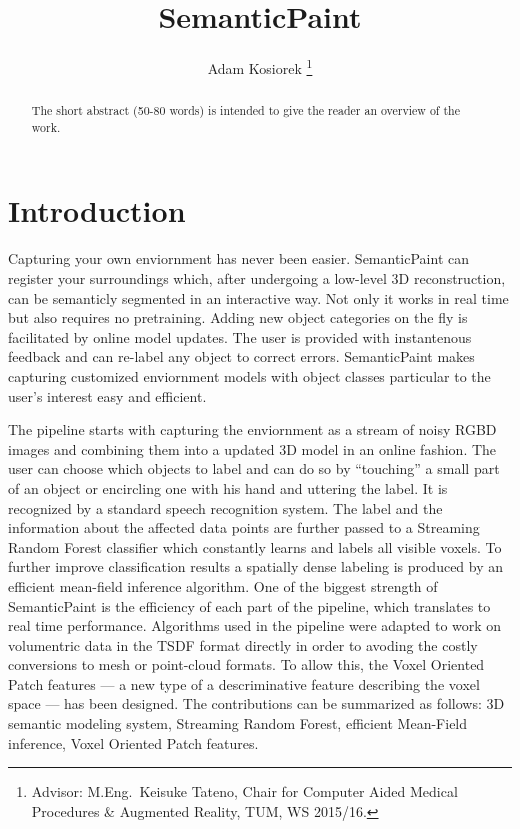 \documentclass{llncs}
\begin{document}
	\title{SemanticPaint}
	\author{Adam Kosiorek
	\thanks{Advisor: M.Eng.~Keisuke Tateno, Chair for Computer Aided Medical Procedures \& Augmented Reality, TUM, WS 2015/16.}}
	\institute{}
	\maketitle

\begin{abstract}
	The short abstract (50-80 words) is intended to give the reader an overview of the work.
\end{abstract}

\section{Introduction}
  
  
  Capturing your own enviornment has never been easier. SemanticPaint can register your surroundings which, after undergoing a low-level 3D reconstruction, can be semanticly segmented in an interactive way. Not only it works in real time but also requires no pretraining. Adding new object categories on the fly is facilitated by online model updates. The user is provided with instantenous feedback and can re-label any object to correct errors. SemanticPaint makes capturing customized enviornment models with object classes particular to the user's interest easy and efficient.  
  
  The pipeline starts with capturing the enviornment as a stream of noisy RGBD images and combining them into a updated 3D model in an online fashion. The user can choose which objects to label and can do so by ``touching'' a small part of an object or encircling one with his hand and uttering the label. It is recognized by a standard speech recognition system. The label and the information about the affected data points are further passed to a Streaming Random Forest classifier which constantly learns and labels all visible voxels. To further improve classification results a spatially dense labeling is produced by an efficient mean-field inference algorithm. One of the biggest strength of SemanticPaint is the efficiency of each part of the pipeline, which translates to real time performance. Algorithms used in the pipeline were adapted to work on volumentric data in the TSDF format directly in order to avoding the costly conversions to mesh or point-cloud formats. To allow this, the Voxel Oriented Patch features --- a new type of a descriminative feature describing the voxel space --- has been designed. 
  The contributions can be summarized as follows: 3D semantic modeling system, Streaming Random Forest, efficient Mean-Field inference, Voxel Oriented Patch features.
  
\end{document}
